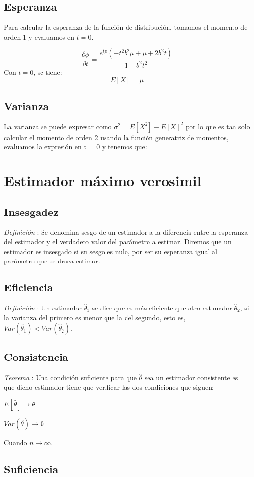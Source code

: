 \documentclass[a4paper, 10pt]{article} %
\newcounter{def}
\newcounter{teo}
\begin{document}
\subsection{Esperanza}

Para calcular la esperanza de la función de distribución, tomamos el momento de orden 1 y evaluamos en $t = 0$. 

$$\frac{\partial\phi}{\partial t} = \frac{e^{t\mu} (-t^2 b^2\mu + \mu + 2b^2t)}{1-b^2 t^2}$$
Con $t = 0$, se tiene: 
$$E[X]=\mu$$

\subsection{Varianza}

La varianza se puede expresar como $\sigma^2 = E[X^2] - E[X]^2$ por lo que es tan solo calcular el momento de
orden 2 usando la función generatriz de momentos, evaluamos la expresión en t = 0 y tenemos que:

\section{Estimador máximo verosimil}

\subsection{Insesgadez}
\addtocounter{def}{1}
\emph{Definición }: Se denomina sesgo de un estimador a la diferencia entre la esperanza del estimador
y el verdadero valor del parámetro a estimar. Diremos que un estimador es insesgado si su sesgo es nulo, por ser
su esperanza igual al parámetro que se desea estimar.

\subsection{Eficiencia}
\addtocounter{def}{1}
\emph{Definición }: Un estimador $\hat{\theta}_1$ se dice que es más eficiente que otro estimador
$\hat{\theta}_2$, si la varianza del primero es menor que la del segundo, esto es,  $Var(\hat{\theta}_1)<Var(\hat{\theta}_2)$.

\subsection{Consistencia}
\addtocounter{teo}{1}
\emph{Teorema }: Una condición suficiente para que $\hat{\theta}$ sea un estimador consistente es que
dicho estimador tiene que verificar las dos condiciones que siguen:

\begin{description}
\item $E[\hat{\theta}] \rightarrow \theta$
\item $Var(\hat{\theta}) \rightarrow 0$
\end{description}
Cuando $n \rightarrow \infty$.

\subsection{Suficiencia}
\end{document}

